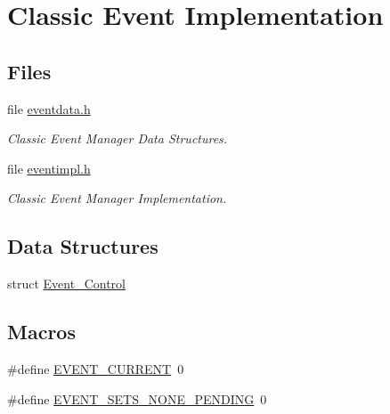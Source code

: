 \hypertarget{group__ClassicEventImpl}{}\section{Classic Event Implementation}
\label{group__ClassicEventImpl}
\subsection*{Files}
\begin{DoxyCompactItemize}
\item 
file \mbox{\hyperlink{eventdata_8h}{eventdata.\+h}}
\begin{DoxyCompactList}\small\item\em Classic Event Manager Data Structures. \end{DoxyCompactList}\item 
file \mbox{\hyperlink{eventimpl_8h}{eventimpl.\+h}}
\begin{DoxyCompactList}\small\item\em Classic Event Manager Implementation. \end{DoxyCompactList}\end{DoxyCompactItemize}
\subsection*{Data Structures}
\begin{DoxyCompactItemize}
\item 
struct \mbox{\hyperlink{structEvent__Control}{Event\+\_\+\+Control}}
\end{DoxyCompactItemize}
\subsection*{Macros}
\begin{DoxyCompactItemize}
\item 
\#define \mbox{\hyperlink{group__ClassicEventImpl_ga389f92d1a5ea7eb4e9bb7ddb3464700e}{E\+V\+E\+N\+T\+\_\+\+C\+U\+R\+R\+E\+NT}}~0
\item 
\#define \mbox{\hyperlink{group__ClassicEventImpl_ga07a7e358ae0de9212f4cd588e4762983}{E\+V\+E\+N\+T\+\_\+\+S\+E\+T\+S\+\_\+\+N\+O\+N\+E\+\_\+\+P\+E\+N\+D\+I\+NG}}~0
\end{DoxyCompactItemize}
